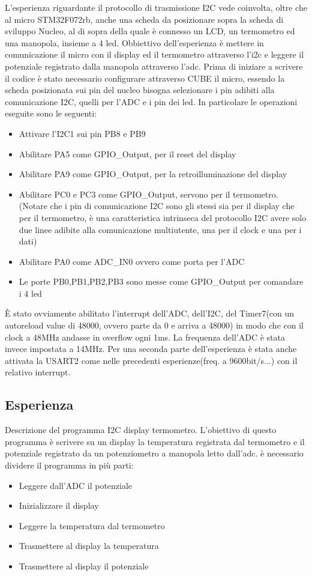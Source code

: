\documentclass[main.tex]{subfiles}
\begin{document}
L'esperienza riguardante il protocollo di trasmissione I2C vede coinvolta, oltre che al micro STM32F072rb, anche una scheda da posizionare sopra la scheda di sviluppo Nucleo, al di sopra della quale è connesso un LCD, un termometro ed una manopola, insieme a 4 led. Obbiettivo dell'esperienza è mettere in comunicazione il micro con il display ed il termometro attraverso l'i2c e leggere il potenziale registrato dalla manopola attraverso l'adc. 
Prima di iniziare a scrivere il codice è stato necessario configurare attraverso CUBE il micro, essendo la scheda posizionata sui pin del nucleo bisogna selezionare i pin adibiti alla comunicazione I2C, quelli per l'ADC e i pin dei led. In particolare le operazioni eseguite sono le seguenti:
\begin{itemize}
    \item Attivare l'I2C1 sui pin PB8 e PB9
    \item Abilitare PA5 come GPIO\_Output, per il reset del display
    \item Abilitare PA9 come GPIO\_Output, per la retroilluminazione del display
    \item Abilitare PC0 e PC3 come GPIO\_Output, servono per il termometro. (Notare che i pin di comunicazione I2C sono gli stessi sia per il display che per il termometro, è una caratteristica intrinseca del protocollo I2C avere solo due linee adibite alla comunicazione multiutente, una per il clock e una per i dati)
    \item Abilitare PA0 come ADC\_IN0 ovvero come porta per l'ADC
    \item Le porte PB0,PB1,PB2,PB3 sono messe come GPIO\_Output per comandare i 4 led
\end{itemize}
È stato ovviamente abilitato l'interrupt dell'ADC, dell'I2C, del Timer7(con un autoreload value di 48000, ovvero parte da 0 e arriva a 48000) in modo che con il clock a 48MHz andasse in overflow ogni 1ms. La frequenza dell'ADC è stata invece impostata a 14MHz.
Per una seconda parte dell'esperienza è stata anche attivata la USART2 come nelle precedenti esperienze(freq. a 9600bit/s...) con il relativo interrupt.


\subsection{Esperienza}

Descrizione del programma I2C display termometro. 
L'obiettivo di questo programma è scrivere su un display la temperatura registrata dal termometro e 
il potenziale registrato da un potenziometro a manopola letto dall'adc.
è necessario dividere il programma in più parti:
\begin{itemize}
    \item Leggere dall'ADC il potenziale
    \item Inizializzare il display
    \item Leggere la temperatura dal termometro
    \item Trasmettere al display la temperatura
    \item Trasmettere al display il potenziale
\end{itemize}
\end{document}
